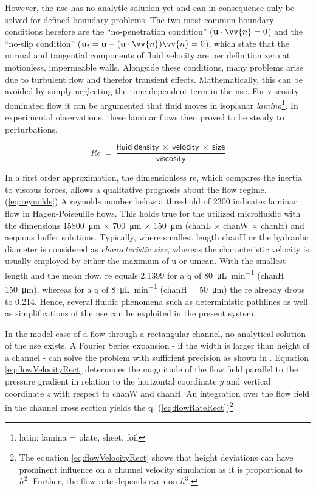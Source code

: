 However, the \gls{nse} has no analytic solution yet and can in consequence only be solved for defined boundary problems. The two most common boundary conditions herefore are the ``no-penetration condition'' ($\mathbf{u} \cdot \vv{n} = 0$) and the ``no-slip condition'' ($\mathbf{u}_t = \mathbf{u} - (\mathbf{u}\cdot \vv{n}) \vv{n} = 0$), which state that the normal and tangential components of fluid velocity are per definition zero at motionless, impermeable walls.\newline
Alongside these conditions, many problems arise due to turbulent flow and therefor transient effects. Mathematically, this can be avoided by simply neglecting the time-dependent term in the \gls{nse}. For viscosity dominated flow it can be argumented that fluid moves in isoplanar \textit{lamina}\footnote{latin: lamina = plate, sheet, foil}. In experimental observations, these laminar flows then proved to be steady to perturbations.

\begin{equation}
	\mathit{Re}\ =\ \frac{\mathrm{\mathsf{fluid\ density\ \times \ velocity\ \times\ size}}}{\mathrm{\mathsf{viscosity}}} \label{eq:reynolds}
\end{equation}

In a first order approximation, the dimensionless \gls{re}, which compares the inertia to viscous forces, allows a qualitative prognosis about the flow regime. (\cref{eq:reynolds}) A reynolds number below a threshold of 2300 indicates laminar flow in Hagen-Poiseuille flows. This holds true for the utilized microfluidic with the dimensions \SI{15800}{\micro\meter} $\times$ \SI{700}{\micro\meter} $\times$ \SI{150}{\micro\meter} (\gls{chanL} $\times$ \gls{chanW} $\times$ \gls{chanH}) and aequous buffer solutions. Typically, where smallest length \gls{chanH} or the hydraulic diameter is considered as \textit{characteristic size}, whereas the characteristic velocity is usually employed by either the maximum of \gls{u} or \gls{umean}. With the smallest length and the mean flow, \gls{re} equals \num{2.1399} for a \gls{q} of \SI{80}{\micro\liter\per\minute} (\gls{chanH} = \SI{150}{\micro\meter}), whereas for a \gls{q} of \SI{8}{\micro\liter\per\minute} (\gls{chanH} = \SI{50}{\micro\meter}) the \acrlong{re} already drops to \num{0.214}.  Hence, several fluidic phenomena such as deterministic pathlines as well as simplifications of the \gls{nse} can be exploited in the present system. 

In the model case of a flow through a rectangular channel, no analytical solution of the \gls{nse} exists. A Fourier Series expansion - if the width is larger than height of a channel - can solve the problem with sufficient precision as shown in \citet{lit:fluidic:bruus}. Equation \cref{eq:flowVelocityRect} determines the magnitude of the flow field parallel to the pressure gradient in relation to the horizontal coordinate $y$ and vertical coordinate $z$ with respect to \gls{chanW} and \gls{chanH}. An integration over the flow field in the channel cross section yields the \gls{q}. (\cref{eq:flowRateRect})\footnote{The equation \cref{eq:flowVelocityRect} shows that height deviations can have prominent influence on a channel velocity simulation as it is proportional to $h^2$. Further, the flow rate depends even on $h^3$.} 

